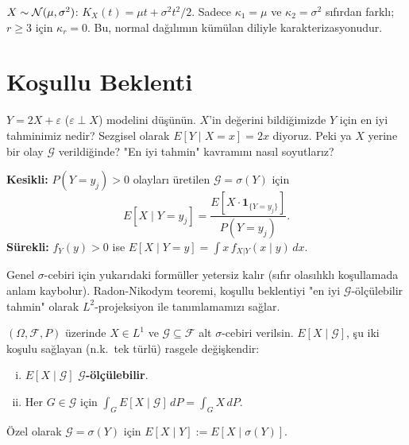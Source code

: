 \begin{ornek}
$X \sim \mathcal{N}(\mu, \sigma^2)$: $K_X(t) = \mu t + \sigma^2 t^2/2$.
Sadece $\kappa_1 = \mu$ ve $\kappa_2 = \sigma^2$ sıfırdan farklı;
$r \geq 3$ için $\kappa_r = 0$.
Bu, normal dağılımın kümülan diliyle karakterizasyonudur.
\end{ornek}

\section{Koşullu Beklenti}
\label{sec:kosullu_beklenti}

\begin{kesif}
$Y = 2X + \varepsilon$ ($\varepsilon \perp X$) modelini düşünün.
$X$'in değerini bildiğimizde $Y$ için en iyi tahminimiz nedir?
Sezgisel olarak $E[Y \mid X = x] = 2x$ diyoruz.
Peki ya $X$ yerine bir olay $\mathcal{G}$ verildiğinde?
"En iyi tahmin" kavramını nasıl soyutlarız?
\end{kesif}

\begin{tanim}
\label{def:kosullu_beklenti_elem}
\textbf{Kesikli:} $P(Y = y_j) > 0$ olayları üretilen $\mathcal{G} = \sigma(Y)$ için
\[
  E[X \mid Y = y_j] = \frac{E[X \cdot \mathbf{1}_{\{Y=y_j\}}]}{P(Y = y_j)}.
\]
\textbf{Sürekli:} $f_Y(y) > 0$ ise $E[X \mid Y = y] = \int x \, f_{X|Y}(x \mid y) \, dx$.
\end{tanim}

\begin{tanimgerekce}
Genel $\sigma$-cebiri için yukarıdaki formüller yetersiz kalır (sıfır olasılıklı koşullamada anlam kaybolur).
Radon-Nikodym teoremi, koşullu beklentiyi "en iyi $\mathcal{G}$-ölçülebilir tahmin"
olarak $L^2$-projeksiyon ile tanımlamamızı sağlar.
\end{tanimgerekce}

\begin{tanim}
\label{def:kosullu_beklenti}
$(\Omega, \mathcal{F}, P)$ üzerinde $X \in L^1$ ve $\mathcal{G} \subseteq \mathcal{F}$
alt $\sigma$-cebiri verilsin. $E[X \mid \mathcal{G}]$, şu iki koşulu sağlayan
(n.k.\ tek türlü) rasgele değişkendir:
\begin{enumerate}[(i)]
  \item $E[X \mid \mathcal{G}]$ \textbf{$\mathcal{G}$-ölçülebilir}.
  \item Her $G \in \mathcal{G}$ için $\int_G E[X \mid \mathcal{G}] \, dP = \int_G X \, dP$.
\end{enumerate}
Özel olarak $\mathcal{G} = \sigma(Y)$ için $E[X \mid Y] := E[X \mid \sigma(Y)]$.
\end{tanim}

